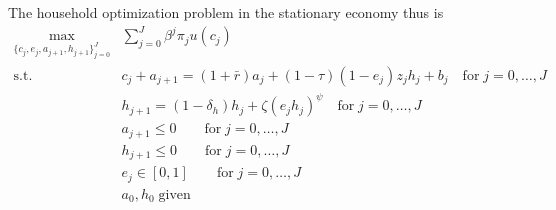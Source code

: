 The household optimization problem in the stationary economy thus is
\begin{align*}
    \max_{\{c_j, e_j, a_{j+1}, h_{j+1}\}_{j=0}^J} & \sum_{j=0}^J \beta^j \pi_{j} u(c_j) \\
    \text{s.t.} \;  & c_j + a_{j+1} = (1+\bar{r}) a_j + (1-\tau) (1-e_j) z_j h_j + b_j \quad\text{for}\; j=0,\dots,J \\
                    & h_{j+1} = (1-\delta_h) h_j + \zeta (e_j h_j)^\psi \quad\text{for}\; j=0,\dots,J \\
                    & a_{j+1} \leq 0 \quad \quad\text{for}\; j=0,\dots,J \\
                    & h_{j+1} \leq 0 \quad \quad\text{for}\; j=0,\dots,J \\
                    & e_j \in [0, 1] \quad \quad\text{for}\; j=0,\dots,J \\
                    & a_0, h_0 \;\text{given}
\end{align*}


